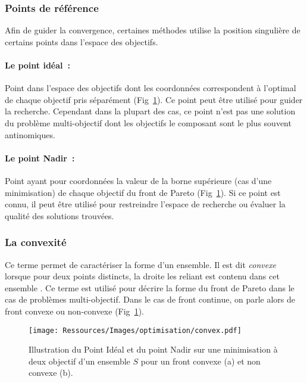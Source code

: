 \subsubsection{Points de référence} %
\label{ssub:points_de_reference}
Afin de guider la convergence, certaines méthodes utilise la position singulière
de certains points dans l’espace des objectifs.
\paragraph{Le point idéal~:} %
\label{par:le_point_idéal}
Point dans l’espace des objectifs dont les coordonnées correspondent à l’optimal
de chaque objectif pris séparément (Fig~\ref{fig:convex_nadir}). Ce point peut
être utilisé pour guider la recherche. Cependant dans la plupart des cas, ce
point n’est pas une solution du problème multi-objectif dont les objectifs le
composant sont le plus souvent antinomiques.

\paragraph{Le point Nadir~:} %
\label{par:le_point_nadir}
Point ayant pour coordonnées la valeur de la borne supérieure (cas d’une
minimisation) de chaque objectif du front de Pareto (Fig~\ref{fig:convex_nadir}).
Si ce point est connu, il peut être utilisé pour restreindre l’espace de
recherche ou évaluer la qualité des solutions trouvées.


\subsubsection{La convexité} %
\label{ssub:la_convexite}
Ce terme permet de caractériser la forme d’un ensemble. Il est dit
\emph{convexe} lorsque pour deux points distincts, la droite les reliant est
contenu dans cet ensemble \parencite{Collette2002}. Ce terme est utilisé pour
décrire la forme du front de Pareto dans le cas de problèmes multi-objectif.
Dans le cas de front continue, on parle alors de front convexe ou non-convexe
(Fig~\ref{fig:convex_nadir}).

\begin{figure}
    \begin{center}
        \texttt{[image: Ressources/Images/optimisation/convex.pdf]}
    \end{center}
    \caption{Illustration du Point Idéal et du point Nadir sur une minimisation
             à deux objectif d’un ensemble $S$ pour un front convexe (a) et non
             convexe (b).
             \label{fig:convex_nadir}}
\end{figure}



